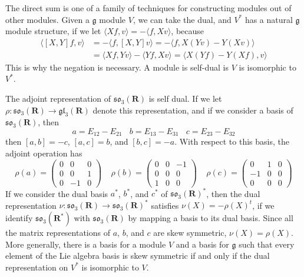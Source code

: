 The direct sum is one of a family of techniques for constructing modules out of other modules. Given a $\mathfrak{g}$ module $V$, we can take the dual, and $V^*$ has a natural $\mathfrak{g}$ module structure, if we let $\langle Xf, v \rangle = - \langle f, Xv \rangle$, because
%
\begin{align*}
    \langle [X,Y]f, v \rangle &= - \langle f, [X,Y] v \rangle = - \langle f, X(Yv) - Y(Xv) \rangle\\
    &= \langle Xf, Yv \rangle - \langle Yf, Xv \rangle = \langle X(Yf) - Y(Xf), v \rangle
\end{align*}
%
This is why the negation is necessary. A module is self-dual is $V$ is isomorphic to $V^*$.

\begin{example}
    The adjoint representation of $\mathfrak{so}_3(\mathbf{R})$ is self dual. If we let $\rho: \mathfrak{so}_3(\mathbf{R}) \to \mathfrak{gl}_3(\mathbf{R})$ denote this representation, and if we consider a basis of $\mathfrak{so}_3(\mathbf{R})$, then
    \[ a = E_{12} - E_{21}\ \ \ \ b = E_{13} - E_{31}\ \ \ \ c = E_{23} - E_{32} \]
    then $[a,b] = -c$, $[a,c] = b$, and $[b,c] = -a$. With respect to this basis, the adjoint operation has
    \[ \rho(a) = \begin{pmatrix} 0 & 0 & 0 \\ 0 & 0 & 1 \\ 0 & -1 & 0 \end{pmatrix}\ \ \ \ \ \rho(b) = \begin{pmatrix} 0 & 0 & -1 \\ 0 & 0 & 0 \\ 1 & 0 & 0 \end{pmatrix}\ \ \ \ \ \rho(c) = \begin{pmatrix} 0 & 1 & 0 \\ -1 & 0 & 0 \\ 0 & 0 & 0 \end{pmatrix} \]
    If we consider the dual basis $a^*$, $b^*$, and $c^*$ of $\mathfrak{so}_3(\mathbf{R})^*$, then the dual representation $\nu: \mathfrak{so}_3(\mathbf{R}) \to \mathfrak{so}_3(\mathbf{R})^*$ satisfies $\nu (X) = - \rho(X)^t$, if we identify $\mathfrak{so}_3(\mathbf{R}^*)$ with $\mathfrak{so}_3(\mathbf{R})$ by mapping a basis to its dual basis. Since all the matrix representations of $a$, $b$, and $c$ are skew symmetric, $\nu(X) = \rho(X)$. More generally, there is a basis for a module $V$ and a basis for $\mathfrak{g}$ such that every element of the Lie algebra basis is skew symmetric if and only if the dual representation on $V^*$ is isomorphic to $V$.
\end{example}


